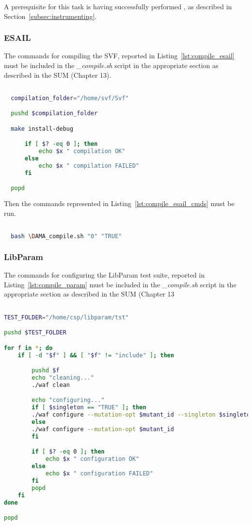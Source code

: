 A prerequisite for this task is having successfully performed , as described in Section~\ref{subsec:instrumenting}.

\subsubsection{ESAIL}

The commands for compiling the SVF, reported in Listing~\ref{lst:compile_esail} must be included in the \emph{\DAMA\_compile.sh} script in the appropriate section as described in the SUM (Chapter 13).


  \begin{lstlisting}[language=bash, label={lst:compile_esail}]

  compilation_folder="/home/svf/Svf"

  pushd $compilation_folder

  make install-debug

      if [ $? -eq 0 ]; then
          echo $x " compilation OK"
      else
          echo $x " compilation FAILED"
      fi

  popd

  \end{lstlisting}

Then the commands represented in Listing~\ref{lst:compile_esail_cmds} must be run.

  \begin{lstlisting}[language=bash, label={lst:compile_esail_cmds}]

  bash \DAMA_compile.sh "0" "TRUE"

  \end{lstlisting}

\subsubsection{LibParam}

The commands for configuring the LibParam test suite, reported in Listing~\ref{lst:compile_param} must be included in the \emph{\DAMA\_compile.sh} script in the appropriate section as described in the SUM (Chapter 13


\begin{lstlisting}[language=bash, label={lst:compile_param}]

TEST_FOLDER="/home/csp/libparam/tst"

pushd $TEST_FOLDER

for f in *; do
    if [ -d "$f" ] && [ "$f" != "include" ]; then

        pushd $f
        echo "cleaning..."
        ./waf clean

        echo "configuring..."
        if [ $singleton == "TRUE" ]; then
        ./waf configure --mutation-opt $mutant_id --singleton $singleton
        else
        ./waf configure --mutation-opt $mutant_id
        fi

        if [ $? -eq 0 ]; then
            echo $x " configuration OK"
        else
            echo $x " configuration FAILED"
        fi
        popd
    fi
done

popd

\end{lstlisting}

